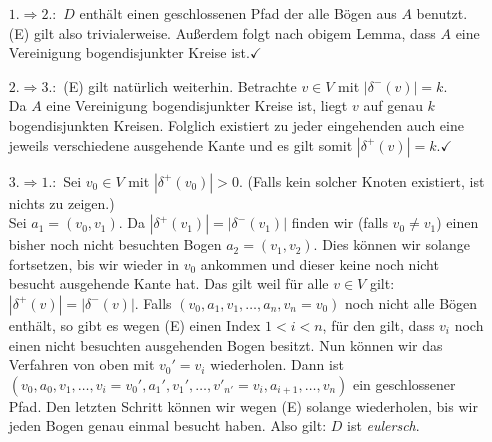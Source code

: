 \documentclass[a4paper,10pt,german]{scrartcl}
\newcommand{\ra}{\Rightarrow}
\begin{document}
\begin{itemize}
  \itemindent=20pt
  \item[$1. \ra 2.:$] $D$ enthält einen geschlossenen Pfad der alle Bögen aus $A$ benutzt. 
  (E) gilt also trivialerweise. Außerdem folgt nach obigem Lemma, dass $A$ eine Vereinigung 
  bogendisjunkter Kreise ist.\hfill $\checkmark$ 
  \item[$2. \ra 3.:$](E) gilt natürlich weiterhin. Betrachte $v\in V$ mit $|\delta^-(v)|=k$.\\
  Da $A$ eine Vereinigung bogendisjunkter Kreise ist, liegt $v$ auf genau $k$ bogendisjunkten Kreisen. Folglich existiert zu jeder eingehenden auch eine jeweils verschiedene ausgehende Kante und es gilt somit $|\delta^+(v)|=k$.\hfill$\checkmark$
  \item[$3. \ra 1.:$] Sei $v_0\in V$ mit $|\delta^+(v_0)|>0$. (Falls kein solcher Knoten existiert, ist nichts zu zeigen.)\\
  Sei $a_1=(v_0,v_1)$. Da $|\delta^+(v_1)|=|\delta^-(v_1)|$ finden wir (falls $v_0\neq v_1$) einen bisher noch nicht besuchten Bogen $a_2=(v_1,v_2)$. Dies können wir solange fortsetzen, bis wir wieder in $v_0$ ankommen und dieser keine noch nicht besucht ausgehende Kante hat. Das gilt weil für alle $v\in V$ gilt:\,$|\delta^+(v)|=|\delta^-(v)|$. Falls $(v_0,a_1,v_1,\dots,a_n,v_n=v_0)$ noch nicht alle Bögen enthält, so gibt es wegen (E) einen Index $1<i<n$, für den gilt, dass $v_i$ noch einen nicht besuchten ausgehenden Bogen besitzt. Nun können wir das Verfahren von oben mit $v_0'=v_i$ wiederholen. Dann ist $(v_0,a_0,v_1,\dots,v_i=v_0',a_1',v_1',\dots,v'_{n'}=v_i,a_{i+1},\dots,v_n)$ ein geschlossener Pfad. Den letzten Schritt können wir wegen (E) solange wiederholen, bis wir jeden Bogen genau einmal besucht haben. Also gilt: $D$ ist \emph{eulersch}.

\end{itemize}
\end{document}
